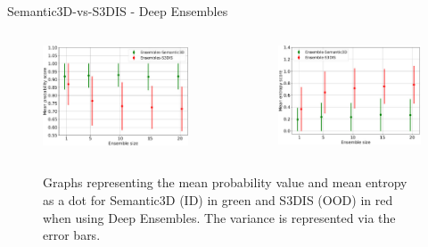 \documentclass[aspectratio=169]{beamer}
\begin{document}
\begin{frame}{Semantic3D-vs-S3DIS - Deep Ensembles}
    \begin{columns}
        \begin{column}{0.5\textwidth}
            \begin{figure}
                \centering
                \includegraphics[scale=0.28]{images/ood1/MSP_Mean_OOD1_DE.jpg}
            \end{figure}
        \end{column}
        \begin{column}{0.5\textwidth}
            \begin{figure}
                \centering
                \includegraphics[scale=0.28]{images/ood1/Ent_Mean_OOD1_DE.jpg}
            \end{figure}
        \end{column}
    \end{columns}
    \begin{figure}
        \caption{Graphs representing the mean probability value and mean entropy as a dot for Semantic3D (ID) in green and
        S3DIS (OOD) in red when using Deep Ensembles. The variance is represented via the error bars.}
    \end{figure}
\end{frame}
\end{document}
